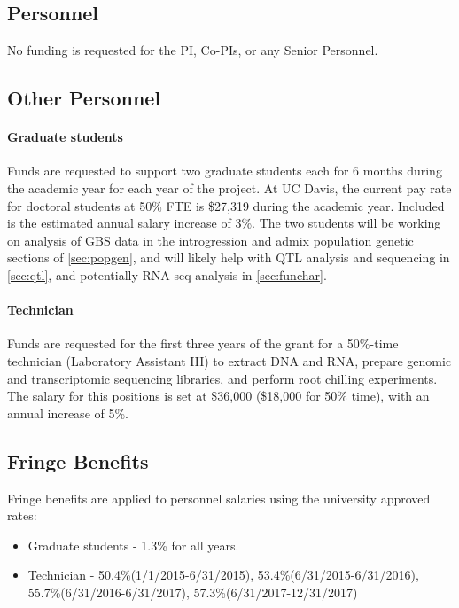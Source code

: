 
\renewcommand{\thepage}{f. Budget Justification - Page \arabic{page} of 3}


\subsection*{Personnel}

No funding is requested for the PI, Co-PIs, or any Senior Personnel.

\subsection*{Other Personnel}
\paragraph{Graduate students} 
Funds are requested to support two graduate students each for 6 months during the academic year for each year of the project. At UC Davis, the current pay rate for doctoral students at 50\% FTE is \$27,319 during the academic year. Included is the estimated annual salary increase of 3\%.  The two students will be working on analysis of GBS data in the introgression and admix population genetic sections of \ref{sec:popgen}, and will likely help with QTL analysis and sequencing in \ref{sec:qtl}, and potentially RNA-seq analysis in \ref{sec:funchar}.

\paragraph{Technician}
Funds are requested for the first three years of the grant for a 50\%-time technician (Laboratory Assistant III) to extract DNA and RNA, prepare genomic and transcriptomic sequencing libraries, and perform root chilling experiments.  The salary for this positions is set at \$36,000 (\$18,000 for 50\% time), with an annual increase of 5\%.

\subsection*{Fringe Benefits}
Fringe benefits are applied to personnel salaries using the university approved rates:
\begin{itemize}
\item Graduate students - 1.3\% for all years.
\item Technician - 50.4\%(1/1/2015-6/31/2015), 53.4\%(6/31/2015-6/31/2016), 55.7\%(6/31/2016-6/31/2017), 57.3\%(6/31/2017-12/31/2017)
\end{itemize}

